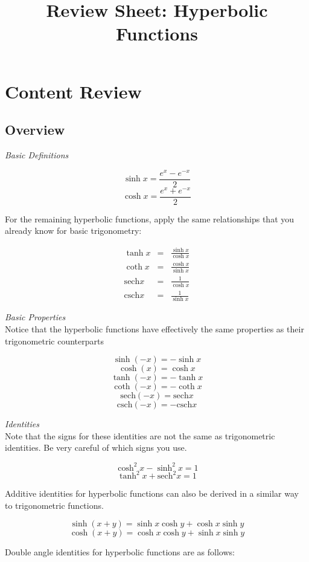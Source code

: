 \documentclass{article}
\title{Review Sheet: Hyperbolic Functions}
\date{}
\author{}
\begin{document}
\maketitle
\vspace{-0.75in}
\section*{Content Review}
\subsection*{Overview}

\textit{Basic Definitions}

$$ \sinh x = \frac{e^x - e^{-x}}{2}$$
$$ \cosh x = \frac{e^x + e^{-x}}{2}$$

For the remaining hyperbolic functions, apply the same relationships that you already know for basic trigonometry:

\begin{eqnarray*}
    \tanh x &=& \frac{\sinh x}{\cosh x}\\
    \coth x &=& \frac{\cosh x}{\sinh x}\\
    \text{sech} x &=& \frac{1}{\cosh x} \\
    \text{csch} x &=& \frac{1}{\sinh x}
\end{eqnarray*}

\noindent\textit{Basic Properties}
\\Notice that the hyperbolic functions have effectively the same properties as their trigonometric counterparts

$$\sinh (-x) = -\sinh x$$
$$\cosh (x) = \cosh x$$
$$\tanh (-x) = -\tanh x$$
$$\coth (-x) = -\coth x$$
$$\text{sech} (-x) = \text{sech}x$$
$$\text{csch} (-x) = -\text{csch}x$$

\vspace{0.2in}
\noindent \textit{Identities}
\\ Note that the signs for these identities are not the same as trigonometric identities. Be very careful of which signs you use. 

$$\cosh^2 x - \sinh^2 x = 1$$
$$\tanh^2 x + \text{sech}^2 x = 1$$

\noindent Additive identities for hyperbolic functions can also be derived in a similar way to trigonometric functions. 

$$\sinh(x+y) = \sinh x \cosh y + \cosh x \sinh y$$
$$\cosh(x+y) = \cosh x \cosh y + \sinh x \sinh y$$

\noindent Double angle identities for hyperbolic functions are as follows:
\end{document}
